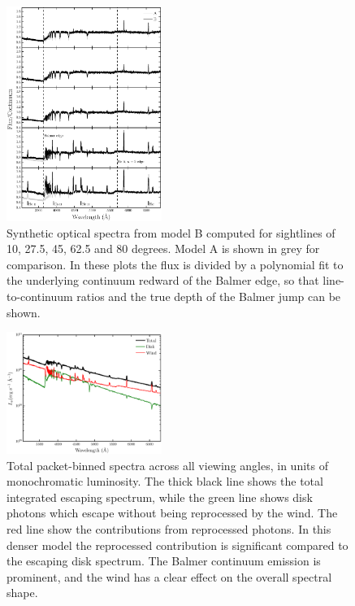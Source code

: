 \documentclass[preprint, a4paper, 11pt]{aastex}
\begin{document}
\begin{figure} 
\includegraphics[width=0.45\textwidth]{figures/modelb_opt_cont.eps}
\caption{
Synthetic optical spectra from model B computed for 
sightlines of 10, 27.5, 45, 62.5 and 80 degrees. 
Model A is shown in grey for comparison.
In these plots the flux is divided by a polynomial fit to the 
underlying continuum redward of the Balmer edge, so that 
line-to-continuum ratios and the true depth of the
Balmer jump can be shown.
}
\label{continuumb}
\end{figure} 

\begin{figure} 
\includegraphics[width=0.45\textwidth]{figures/modelb_escaping.eps}
\caption{Total packet-binned spectra across all viewing angles, in units
of monochromatic luminosity. 
The thick black line shows the total 
integrated escaping spectrum, 
while the green line shows disk photons which escape without being reprocessed by
the wind. The red line show the contributions from reprocessed 
photons. 
In this denser model the reprocessed contribution is significant compared
to the escaping disk spectrum. The Balmer continuum emission is prominent, and
the wind has a clear effect on the overall spectral shape.}
\label{modelb_escape}
\end{figure} 
\end{document}
